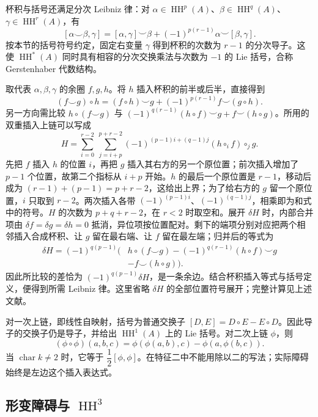 杯积与括号还满足分次 Leibniz 律：对 \(\alpha\in\operatorname{HH}^p(A)\)、\(\beta\in\operatorname{HH}^q(A)\)、\(\gamma\in\operatorname{HH}^r(A)\)，有
\[
	[\alpha\smile\beta,\gamma] =[\alpha,\gamma]\smile\beta +(-1)^{p(r-1)}\alpha\smile[\beta,\gamma].
\]
按本节的括号符号约定，固定右变量 \(\gamma\) 得到杯积的次数为 \(r-1\) 的分次导子。这使 \(\operatorname{HH}^*(A)\) 同时具有相容的分次交换乘法与次数为 \(-1\) 的 Lie 括号，合称 Gerstenhaber 代数结构。\cite[Section 8, Theorem 5, Corollaries 1--2, pp. 285--287]{Gerstenhaber1963CohomologyStructure}
\begin{proofsketch}
	取代表 \(\alpha,\beta,\gamma\) 的余圈 \(f,g,h\)。将 \(h\) 插入杯积的前半或后半，直接得到
	\[
		(f\smile g)\circ h =(f\circ h)\smile g+(-1)^{p(r-1)}f\smile(g\circ h).
	\]
	另一方向需比较 \(h\circ(f\smile g)\) 与 \((-1)^{q(r-1)}(h\circ f)\smile g+f\smile(h\circ g)\)。所用的双重插入上链可以写成
	\[
		H=\sum_{i=0}^{r-2}\ \sum_{j=i+p}^{p+r-2} (-1)^{(p-1)i+(q-1)j}(h\circ_i f)\circ_j g.
	\]
	先把 \(f\) 插入 \(h\) 的位置 \(i\)，再把 \(g\) 插入其右方的另一个原位置；前次插入增加了 \(p-1\) 个位置，故第二个指标从 \(i+p\) 开始。\(h\) 的最后一个原位置是 \(r-1\)，移动后成为 \((r-1)+(p-1)=p+r-2\)，这给出上界；为了给右方的 \(g\) 留一个原位置，\(i\) 只取到 \(r-2\)。两次插入各带 \((-1)^{(p-1)i}\)、\((-1)^{(q-1)j}\)，相乘即为和式中的符号。\(H\) 的次数为 \(p+q+r-2\)，在 \(r<2\) 时取空和。展开 \(\delta H\) 时，内部合并项由 \(\delta f=\delta g=\delta h=0\) 抵消，异位项按位置配对。剩下的端项分别对应把两个相邻插入合成杯积、让 \(g\) 留在最右端、让 \(f\) 留在最左端；归并后的等式为
	\[
		\begin{aligned}
			\delta H=(-1)^{q(p-1)}\bigl(&h\circ(f\smile g) -(-1)^{q(r-1)}(h\circ f)\smile g\\
			&-f\smile(h\circ g)\bigr).
		\end{aligned}
	\]
	因此所比较的差恰为 \((-1)^{q(p-1)}\delta H\)，是一条余边。结合杯积插入等式与括号定义，便得到所需 Leibniz 律。这里省略 \(\delta H\) 的全部位置符号展开；完整计算见上述文献。
\end{proofsketch}

对一次上链，即线性自映射，括号为普通交换子 \([D,E]=D\circ E-E\circ D\)。因此导子的交换子仍是导子，并给出 \(\operatorname{HH}^1(A)\) 上的 Lie 括号。对二次上链 \(\phi\)，则
\[
	(\phi\circ\phi)(a,b,c) =\phi(\phi(a,b),c)-\phi(a,\phi(b,c)).
\]
当 \(\operatorname{char}k\ne2\) 时，它等于 \(\dfrac12[\phi,\phi]\)。在特征二中不能用除以二的写法；实际障碍始终是左边这个插入表达式。

\subsection{\texorpdfstring{形变障碍与 \(\operatorname{HH}^3\)}{形变障碍与 HH3}}
\label{b4:subsec:1203:03}

